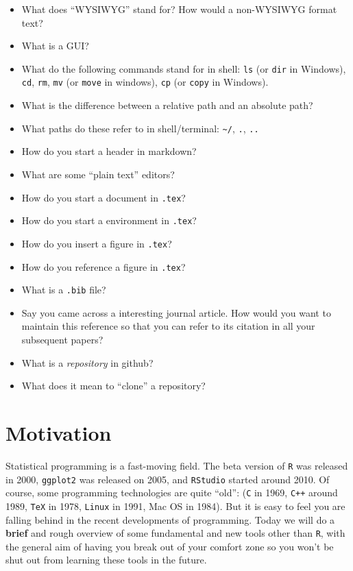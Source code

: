 \documentclass[]{book}
\theoremstyle{definition}
\theoremstyle{definition}
\theoremstyle{definition}
\theoremstyle{remark}
\begin{document}
\begin{itemize}
\item
  What does ``WYSIWYG'' stand for? How would a non-WYSIWYG format text?
\item
  What is a GUI?
\item
  What do the following commands stand for in shell: \texttt{ls} (or
  \texttt{dir} in Windows), \texttt{cd}, \texttt{rm}, \texttt{mv} (or
  \texttt{move} in windows), \texttt{cp} (or \texttt{copy} in Windows).
\item
  What is the difference between a relative path and an absolute path?
\item
  What paths do these refer to in shell/terminal:
  \texttt{\textasciitilde{}/}, \texttt{.}, \texttt{..}
\item
  How do you start a header in markdown?
\item
  What are some ``plain text'' editors?
\item
  How do you start a document in \texttt{.tex}?
\item
  How do you start a environment in \texttt{.tex}?
\item
  How do you insert a figure in \texttt{.tex}?
\item
  How do you reference a figure in \texttt{.tex}?
\item
  What is a \texttt{.bib} file?
\item
  Say you came across a interesting journal article. How would you want
  to maintain this reference so that you can refer to its citation in
  all your subsequent papers?
\item
  What is a \emph{repository} in github?
\item
  What does it mean to ``clone'' a repository?
\end{itemize}

\section{Motivation}\label{motivation-4}

Statistical programming is a fast-moving field. The beta version of
\texttt{R} was released in 2000, \texttt{ggplot2} was released on 2005,
and \texttt{RStudio} started around 2010. Of course, some programming
technologies are quite ``old'': (\texttt{C} in 1969, \texttt{C++} around
1989, \texttt{TeX} in 1978, \texttt{Linux} in 1991, Mac OS in 1984). But
it is easy to feel you are falling behind in the recent developments of
programming. Today we will do a \textbf{brief} and rough overview of
some fundamental and new tools other than \texttt{R}, with the general
aim of having you break out of your comfort zone so you won't be shut
out from learning these tools in the future.
\end{document}

